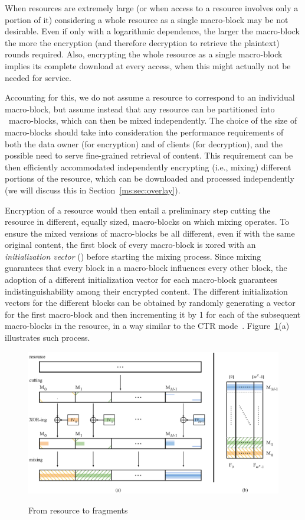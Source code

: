 When resources are extremely large (or when access to a resource involves only a portion of it) considering a whole resource as a single macro-block may be not desirable. Even if only with a logarithmic dependence, the larger the macro-block the more the encryption (and therefore decryption to retrieve the plaintext) rounds required. Also, encrypting the whole resource as a single macro-block implies its complete download at every access, when this might actually not be needed for service.

Accounting for this, we do not assume a resource to correspond to an individual macro-block, but assume instead that any resource can be partitioned into \Mnum\ macro-blocks, which can then be mixed independently. The choice of the size of macro-blocks should take into consideration the performance requirements of both the data owner (for encryption) and of clients (for decryption), and the possible need to serve fine-grained retrieval of content. This requirement can be then efficiently accommodated independently encrypting (i.e., mixing) different portions of the resource, which can be downloaded and processed independently (we will discuss this in Section~\ref{ms:sec:overlay}).

Encryption of a resource would then entail a preliminary step cutting the resource in different, equally sized, macro-blocks on which mixing operates. To ensure the mixed versions of macro-blocks be all different, even if with the same original content, the first block of every macro-block is {\sc xor}ed with an {\em initialization vector\/} () before starting the mixing process. Since mixing guarantees that every block in a macro-block influences every other block, the adoption of a different initialization vector for each macro-block guarantees indistinguishability among their encrypted content. The different initialization vectors for the different blocks can be obtained by randomly generating a vector for the first macro-block and then incrementing it by 1 for each of the subsequent macro-blocks in the resource, in a way similar to the CTR mode~\cite{d01}. Figure~\ref{ms:fig:mixslice}(a) illustrates such process.

\begin{figure}[!t]
\centering
{\includegraphics[width=\columnwidth]{figures/fig04}}
\caption{\label{ms:fig:mixslice} From resource to fragments}
\end{figure}

